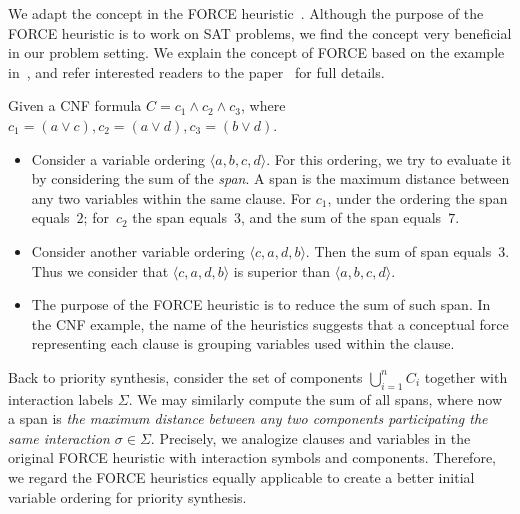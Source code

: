 \documentclass[10pt, a4paper, onecolumn, conference, compsocconf]{IEEEtran}
\begin{document}
We adapt the concept in the FORCE heuristic~\cite{aloul2003force}. Although the purpose of the FORCE heuristic is to work on SAT problems, we find the concept very beneficial in our problem setting. We explain the concept of FORCE based on the example in~\cite{aloul2003force}, and refer interested readers to the paper~\cite{aloul2003force} for full details.

Given a CNF formula $C=c_1\wedge c_2 \wedge c_3$, where $c_1=(a\vee c), c_2=(a\vee d), c_3=(b\vee d)$.
\begin{itemize}
    \item Consider a variable ordering $\langle a,b,c,d\rangle$. For this ordering, we try to evaluate it by considering the sum of the \emph{span}. A span is the maximum distance between any two variables within the same clause. For $c_1$, under the ordering the span equals~$2$; for~$c_2$ the span equals~$3$, and the sum of the span equals~$7$.
    \item Consider another variable ordering $\langle c,a,d,b\rangle$. Then the sum of span equals~$3$. Thus we consider that $\langle c,a,d,b\rangle$ is superior than $\langle a,b,c,d\rangle$.
    \item The purpose of the FORCE heuristic is to reduce the sum of such span. In the CNF example, the name of the heuristics suggests that a conceptual force representing each clause is grouping variables used within the clause.
\end{itemize}

Back to priority synthesis, consider the set of components $\bigcup_{i=1}^{n} C_i$ together with interaction labels $\Sigma$.
We may similarly compute the sum of all spans, where now a span is \emph{the maximum distance between any two components
participating the same interaction $\sigma\in \Sigma$}. Precisely, we analogize clauses and variables in the original FORCE heuristic with interaction symbols and components. Therefore, we regard the FORCE heuristics equally applicable to create a
better initial variable ordering for priority synthesis.
\end{document}
